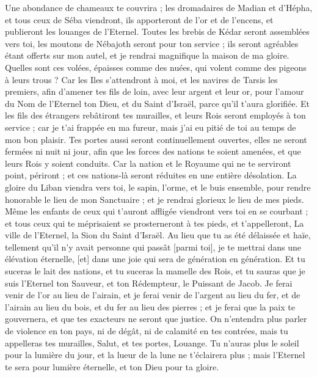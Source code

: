 \begin{multicols}{2}
Une abondance de chameaux te couvrira ; les dromadaires de Madian et d'Hépha, et tous ceux de Séba viendront, ils apporteront de l'or et de l'encens, et publieront les louanges de l'Eternel.
Toutes les brebis de Kédar seront assemblées vers toi, les moutons de Nébajoth seront pour ton service ; ils seront agréables étant offerts sur mon autel, et je rendrai magnifique la maison de ma gloire.
Quelles sont ces volées, épaisses comme des nuées, qui volent comme des pigeons à leurs trous ?
Car les Iles s'attendront à moi, et les navires de Tarsis les premiers, afin d'amener tes fils de loin, avec leur argent et leur or, pour l'amour du Nom de l'Eternel ton Dieu, et du Saint d'Israël, parce qu'il t'aura glorifiée.
Et les fils des étrangers rebâtiront tes murailles, et leurs Rois seront employés à ton service ; car je t'ai frappée en ma fureur, mais j'ai eu pitié de toi au temps de mon bon plaisir.
Tes portes aussi seront continuellement ouvertes, elles ne seront fermées ni nuit ni jour, afin que les forces des nations te soient amenées, et que leurs Rois y soient conduits.
Car la nation et le Royaume qui ne te serviront point, périront ; et ces nations-là seront réduites en une entière désolation.
La gloire du Liban viendra vers toi, le sapin, l'orme, et le buis ensemble, pour rendre honorable le lieu de mon Sanctuaire ; et je rendrai glorieux le lieu de mes pieds.
Même les enfants de ceux qui t'auront affligée viendront vers toi en se courbant ; et tous ceux qui te méprisaient se prosterneront à tes pieds, et t'appelleront, La ville de l'Eternel, la Sion du Saint d'Israël.
Au lieu que tu as été délaissée et haïe, tellement qu'il n'y avait personne qui passât [parmi toi], je te mettrai dans une élévation éternelle, [et] dans une joie qui sera de génération en génération.
Et tu suceras le lait des nations, et tu suceras la mamelle des Rois, et tu sauras que je suis l'Eternel ton Sauveur, et ton Rédempteur, le Puissant de Jacob.
Je ferai venir de l'or au lieu de l'airain, et je ferai venir de l'argent au lieu du fer, et de l'airain au lieu du bois, et du fer au lieu des pierres ; et je ferai que la paix te gouvernera, et que tes exacteurs ne seront que justice.
On n'entendra plus parler de violence en ton pays, ni de dégât, ni de calamité en tes contrées, mais tu appelleras tes murailles, Salut, et tes portes, Louange.
Tu n'auras plus le soleil pour la lumière du jour, et la lueur de la lune ne t'éclairera plus ; mais l'Eternel te sera pour lumière éternelle, et ton Dieu pour ta gloire.

\end{multicols}
